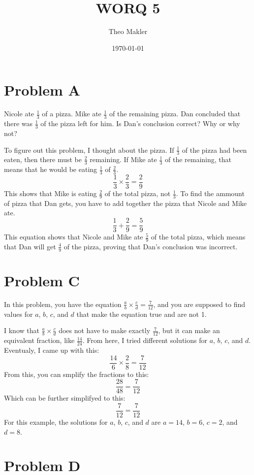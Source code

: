 \documentclass[a4paper]{article}
\title{WORQ 5}
\author{Theo Makler}
\date{\today}
\begin{document}
\maketitle

\section{Problem A}

Nicole ate $\frac{1}{3}$ of a pizza. Mike ate $\frac{1}{3}$ of the remaining pizza. Dan concluded that there was $\frac{1}{3}$ of the pizza left for him. Is Dan's conclusion correct? Why or why not?

To figure out this problem, I thought about the pizza. If $\frac{1}{3}$ of the pizza had been eaten, then there must be $\frac{2}{3}$ remaining. If Mike ate $\frac{1}{3}$ of the remaining, that means that he would be eating $\frac{1}{3}$ of $\frac{2}{3}$.
$$\frac{1}{3}\times\frac{2}{3}=\frac{2}{9}$$
This shows that Mike is eating $\frac{2}{9}$ of the total pizza, not $\frac{1}{3}$. To find the ammount of pizza that Dan gets, you have to add together the pizza that Nicole and Mike ate.
$$ \frac{1}{3}+ \frac{2}{9}= \frac{5}{9}$$
This equation shows that Nicole and Mike ate $\frac{5}{9}$ of the total pizza, which means that Dan will get $\frac{4}{9}$ of the pizza, proving that Dan's conclusion was incorrect.

\section{Problem C}

In this problem, you have the equation $\frac{a}{b}\times\frac{c}{d}=\frac{7}{12}$, and you are supposed to find values for $a$, $b$, $c$, and $d$ that make the equation true and are not 1.

I know that $\frac{a}{b}\times\frac{c}{d}$ does not have to make exactly $\frac{7}{12}$, but it can make an equivalent fraction, like $\frac{14}{24}$. From here, I tried different solutions for $a$, $b$, $c$, and $d$. Eventualy, I came up with this:
$$\frac{14}{6}\times\frac{2}{8}=\frac{7}{12}$$
From this, you can smplify the fractions to this:
$$\frac{28}{48}=\frac{7}{12}$$
Which can be further simplifyed to this:
$$\frac{7}{12}=\frac{7}{12}$$
For this example, the solutions for $a$, $b$, $c$, and $d$ are $a=14$, $b=6$, $c=2$, and $d=8$.

\pagebreak
\section{Problem D}
\end{document}
